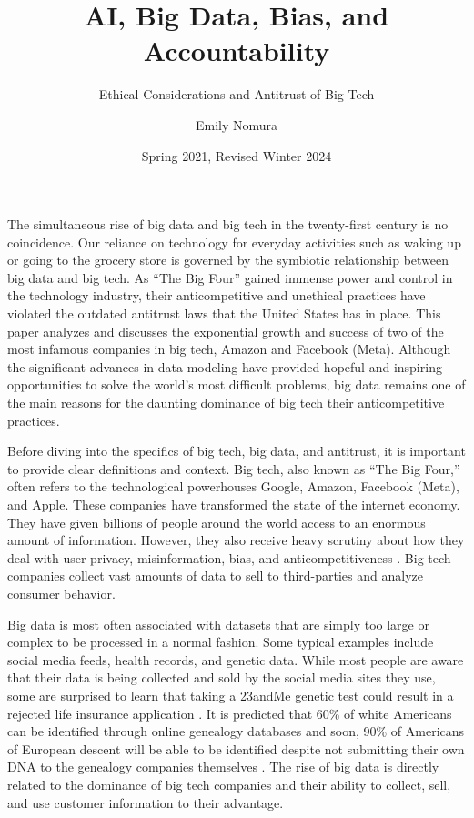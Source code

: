 \documentclass[twoside]{article}
\title{AI, Big Data, Bias, and Accountability}
\subtitle{Ethical Considerations and Antitrust of Big Tech} %
\author{Emily Nomura}
\date{Spring 2021, Revised Winter 2024}
\begin{document}
\maketitle{}

The simultaneous rise of big data and big tech in the twenty-first century is no coincidence. Our reliance on technology for everyday activities such as waking up or going to the grocery store is governed by the symbiotic relationship between big data and big tech. As “The Big Four” gained immense power and control in the technology industry, their anticompetitive and unethical practices have violated the outdated antitrust laws that the United States has in place. This paper analyzes and discusses the exponential growth and success of two of the most infamous companies in big tech, Amazon and Facebook (Meta). Although the significant advances in data modeling have provided hopeful and inspiring opportunities to solve the world’s most difficult problems, big data remains one of the main reasons for the daunting dominance of big tech their anticompetitive practices. 

Before diving into the specifics of big tech, big data, and antitrust, it is important to provide clear definitions and context. Big tech, also known as “The Big Four,” often refers to the technological powerhouses Google, Amazon, Facebook (Meta), and Apple. These companies have transformed the state of the internet economy. They have given billions of people around the world access to an enormous amount of information. However, they also receive heavy scrutiny about how they deal with user privacy, misinformation, bias, and anticompetitiveness \cite{antitrust}. Big tech companies  collect vast amounts of data to sell to third-parties and analyze consumer behavior.

Big data is most often associated with datasets that are simply too large or complex to be processed in a normal fashion. Some typical examples include social media feeds, health records, and genetic data. While most people are aware that their data is being collected and  sold by the social media sites they use, some are surprised to learn that taking a 23andMe genetic test could result in a rejected life insurance application \cite{genetic}. It is predicted that 60\% of white Americans can be identified through online genealogy databases and soon, 90\% of Americans of European descent will be able to be identified despite not submitting their own DNA to the genealogy companies themselves \cite{napkin}. The rise of big data is directly related to the dominance of big tech companies and their ability to collect, sell, and use customer information to their advantage.
\end{document}
